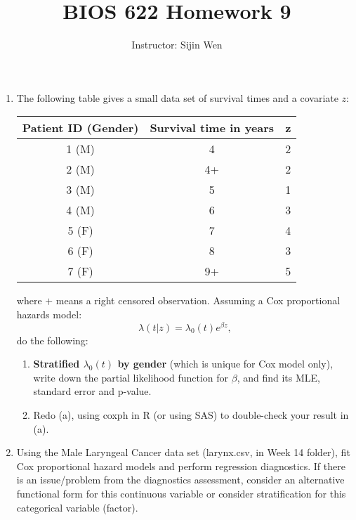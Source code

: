 \documentclass[11pt]{article}
\begin{document}
%
\def\bebf{\mbox{\boldmath $\beta$}}
\def\mubf{\mbox{\boldmath $\mu$}}
\def\epbf{\mbox{\scriptsize\boldmath $\epsilon$}}
\def\mus{\mbox{\scriptsize\boldmath $\mu$}}


\title{BIOS 622 Homework 9 }
\author{Instructor: Sijin Wen}
\maketitle

\baselineskip=13pt


\begin{enumerate}


\item The following table gives a small data set of survival times and a covariate $z$:

\begin{center}

\begin{tabular}{|c|c|c|}
 \hline
\hline
Patient ID (Gender) & Survival time in years & z
\\
\hline
1 (M)	& 4 & 2\\
\hline
2 (M)	&4+ & 2\\
\hline
3 (M)	&5& 1\\
\hline
4 (M)	& 6 & 3\\
\hline
5 (F)	& 7 & 4\\
\hline
6 (F)	&8 & 3\\
\hline
7 (F)	&9+ & 5\\
\hline
\hline

\end{tabular}
\end{center}

where $+$ means a right censored observation. Assuming a Cox proportional hazards model:
$$
\lambda(t|z) = \lambda_0(t) e^{\beta z},
$$
do the following:
\begin{enumerate}

\item \textbf{Stratified $\lambda_0(t)$ by gender} (which is unique for Cox model only), write down the partial likelihood function for $\beta$, and find its MLE, standard error and p-value. 
\item Redo (a), using coxph in R (or using SAS) to double-check your result in (a).
\end{enumerate}



\item Using the Male Laryngeal Cancer data set (larynx.csv, in Week 14 folder), fit Cox proportional hazard models and perform regression diagnostics. If there is an issue/problem from the diagnostics assessment, consider an alternative functional form for this continuous variable or consider stratification for this categorical variable (factor).


\end{enumerate}
\end{document}
